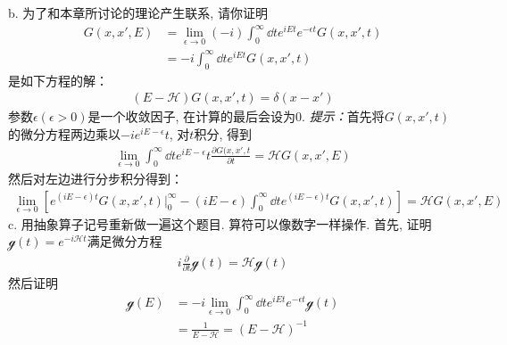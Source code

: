 {\noindent b. 为了和本章所讨论的理论产生联系, 请你证明
\begin{align*}
G(x,x',E) & = \lim_{\epsilon\to0}(-i) \int_0^\infty\dd t e^{iEt}e^{-\epsilon t} G(x,x',t)\\
          & = -i \int_{0}^{\infty}\dd t e^{iEt}G(x,x',t)
\end{align*}
是如下方程的解：
\begin{align*}
(E-\mathscr{H})G(x,x',t) = \delta(x - x')
\end{align*}
参数$\epsilon(\epsilon>0)$是一个收敛因子, 在计算的最后会设为$0$. \textit{提示：}首先将$G(x,x',t)$的微分方程两边乘以$-ie^{iE-\epsilon}t$, 对$t$积分, 得到
\begin{align*}
\lim\limits_{\epsilon\to 0} \int_0^\infty\dd t e^{iE-\epsilon}t \frac{\partial G(x,x',t}{\partial t} = \mathscr{H} G(x,x',E)
\end{align*}
然后对左边进行分步积分得到：
\begin{align*}
\lim\limits_{\epsilon\to 0} \left[ e^{(iE-\epsilon)t}G(x,x',t)\Big|_0^\infty - (iE-\epsilon)\int_{0}^{\infty}\dd t e^{(iE-\epsilon)t}G(x,x',t) \right] = \mathscr{H} G(x,x',E)
\end{align*}
\noindent c. 用抽象算子记号重新做一遍这个题目. 算符可以像数字一样操作. 首先, 证明$\mathscr{g}(t) = e^{-i\mathscr{H}t}$满足微分方程
\begin{align*}
i\frac{\partial}{\partial t}\mathscr{g}(t) = \mathscr{Hg}(t)
\end{align*}
然后证明
\begin{align*}
\mathscr{g}(E) &= -i\lim\limits_{\epsilon\to 0}\int_{0}^{\infty} \dd t e^{iEt} e^{-\epsilon t}\mathscr{g}(t)\\
             & = \frac{1}{E-\mathscr{H}} = (E-\mathscr{H})^{-1}
\end{align*}
}

